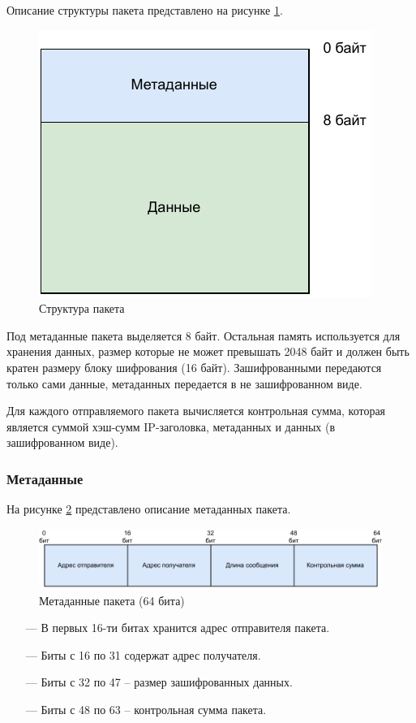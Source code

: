Описание структуры пакета представлено на рисунке \ref{fig:packet}.

\begin{figure}[H]
	\centering
	\includegraphics[width=\textwidth]{img/packet.pdf}
	\caption{Структура пакета}
	\label{fig:packet}
\end{figure}

Под метаданные пакета выделяется 8 байт. Остальная память используется для хранения данных, размер которые не может превышать 2048 байт и должен быть кратен размеру блоку шифрования (16 байт). Зашифрованными передаются только сами данные, метаданных передается в не зашифрованном виде.

Для каждого отправляемого пакета вычисляется контрольная сумма, которая является суммой хэш-сумм IP-заголовка, метаданных и данных (в зашифрованном виде).

\subsubsection{Метаданные}

На рисунке \ref{fig:header} представлено описание метаданных пакета.

\begin{figure}[H]
	\centering
	\includegraphics[width=\textwidth]{img/header.pdf}
	\caption{Метаданные пакета (64 бита)}
	\label{fig:header}
\end{figure}

\begin{itemize}
	\item [---] В первых 16-ти битах хранится адрес отправителя пакета.
	\item [---] Биты с 16 по 31 содержат адрес получателя.
	\item [---] Биты с 32 по 47 -- размер зашифрованных данных.
	\item [---] Биты с 48 по 63 -- контрольная сумма пакета.
\end{itemize}

\pagebreak